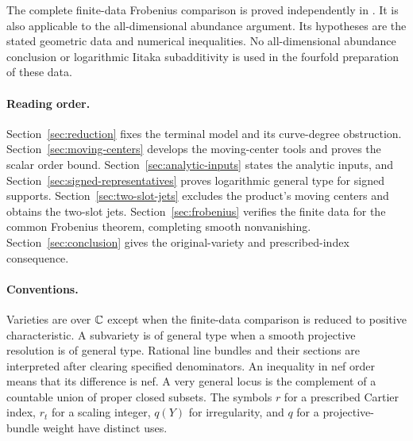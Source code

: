 The complete finite-data Frobenius comparison is proved independently in
\cite[Theorem~9.1]{OpenAIAbundance2026}. It
is also applicable to the all-dimensional abundance argument. Its hypotheses are the stated
geometric data and numerical inequalities. No all-dimensional abundance
conclusion or logarithmic Iitaka subadditivity is used in the fourfold
preparation of these data.

\paragraph{Reading order.}
Section~\ref{sec:reduction} fixes the terminal model and its curve-degree
obstruction. Section~\ref{sec:moving-centers} develops the moving-center
tools and proves the scalar order bound. Section~\ref{sec:analytic-inputs}
states the analytic inputs, and Section~\ref{sec:signed-representatives}
proves logarithmic general type for signed supports.
Section~\ref{sec:two-slot-jets} excludes the product's moving centers
and obtains the two-slot jets.
Section~\ref{sec:frobenius} verifies the finite data for the common
Frobenius theorem, completing smooth nonvanishing.
Section~\ref{sec:conclusion} gives the original-variety and
prescribed-index consequence.

\paragraph{Conventions.}
Varieties are over $\mathbb C$ except when the finite-data comparison is
reduced to positive characteristic. A subvariety is of general type
when a smooth projective resolution is of general type. Rational
line bundles and their sections are interpreted after clearing
specified denominators. An inequality in nef order means that its
difference is nef. A very general locus is the complement of a
countable union of proper closed subsets. The symbols $r$ for a
prescribed Cartier index, $r_t$ for a scaling integer, $q(Y)$ for
irregularity, and $q$ for a projective-bundle weight have distinct uses.
